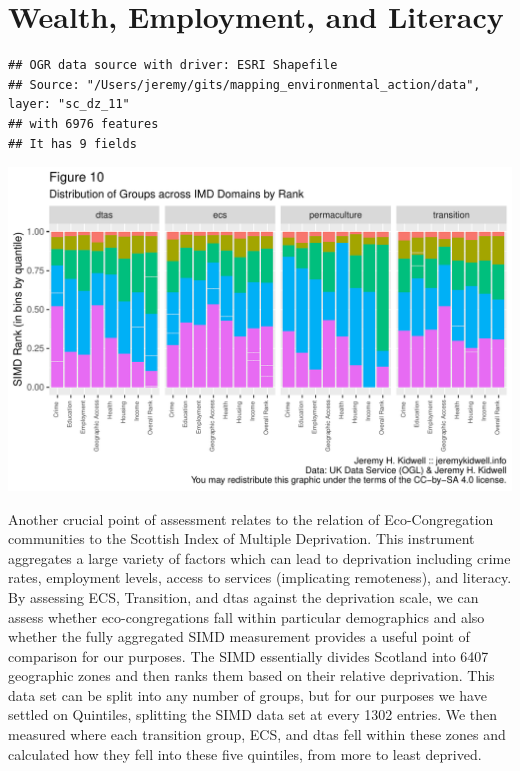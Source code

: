\documentclass[11pt,]{article}
\begin{document}
\hypertarget{wealth-employment-and-literacy}{%
\section{Wealth, Employment, and
Literacy}\label{wealth-employment-and-literacy}}

\begin{verbatim}
## OGR data source with driver: ESRI Shapefile 
## Source: "/Users/jeremy/gits/mapping_environmental_action/data", layer: "sc_dz_11"
## with 6976 features
## It has 9 fields
\end{verbatim}

\includegraphics{figures/create_simd_barplot-1.pdf}

Another crucial point of assessment relates to the relation of
Eco-Congregation communities to the Scottish Index of Multiple
Deprivation. This instrument aggregates a large variety of factors which
can lead to deprivation including crime rates, employment levels, access
to services (implicating remoteness), and literacy. By assessing ECS,
Transition, and dtas against the deprivation scale, we can assess
whether eco-congregations fall within particular demographics and also
whether the fully aggregated SIMD measurement provides a useful point of
comparison for our purposes. The SIMD essentially divides Scotland into
6407 geographic zones and then ranks them based on their relative
deprivation. This data set can be split into any number of groups, but
for our purposes we have settled on Quintiles, splitting the SIMD data
set at every 1302 entries. We then measured where each transition group,
ECS, and dtas fell within these zones and calculated how they fell into
these five quintiles, from more to least deprived.
\end{document}
